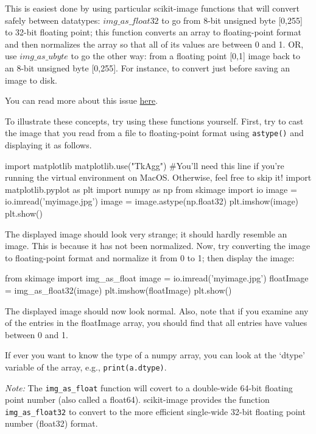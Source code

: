\documentclass{article}
\begin{document}
This is easiest done by using particular scikit-image functions that will convert safely between datatypes:
\href{http://scikit-image.org/docs/dev/api/skimage.html#skimage.img_as_float32}{$img\_as\_float32$} to go from 8-bit unsigned byte [0,255] to 32-bit floating point; this function converts an array to floating-point format and then normalizes the array so that all of its values are between 0 and 1. OR, use \href{http://scikit-image.org/docs/dev/api/skimage.html#skimage.img_as_ubyte}{$img\_as\_ubyte$} to go the other way: from a floating point [0,1] image back to an 8-bit unsigned byte [0,255]. For instance, to convert just before saving an image to disk.

You can read more about this issue \href{http://scikit-image.org/docs/dev/user_guide/data_types.html}{here}.

To illustrate these concepts, try using these functions yourself.
First, try to cast the image that you read from a file to floating-point format using \texttt{astype()} and displaying it as follows.\\
\begin{python}
import matplotlib
matplotlib.use("TkAgg") #You'll need this line if you're running the virtual environment on MacOS. Otherwise, feel free to skip it!
import matplotlib.pyplot as plt
import numpy as np
from skimage import io
image = io.imread('myimage.jpg')
image = image.astype(np.float32)
plt.imshow(image)
plt.show()
\end{python}

The displayed image should look very strange; it should hardly resemble an image. This is because it has not been normalized.
Now, try converting the image to floating-point format and normalize it from 0 to 1; then display the image:
\begin{python}
from skimage import img_as_float
image = io.imread('myimage.jpg')
floatImage = img_as_float32(image)
plt.imshow(floatImage)
plt.show()
\end{python}

The displayed image should now look normal. Also, note that if you examine any of the entries in the floatImage array, you should find that all entries have values between 0 and 1.

If ever you want to know the type of a numpy array, you can look at the `dtype' variable of the array, e.g., \texttt{print(a.dtype)}.

\emph{Note:} The \texttt{img\_as\_float} function will covert to a double-wide 64-bit floating point number (also called a float64). scikit-image provides the function \texttt{img\_as\_float32} to convert to the more efficient single-wide 32-bit floating point number (float32) format.
\end{document}
